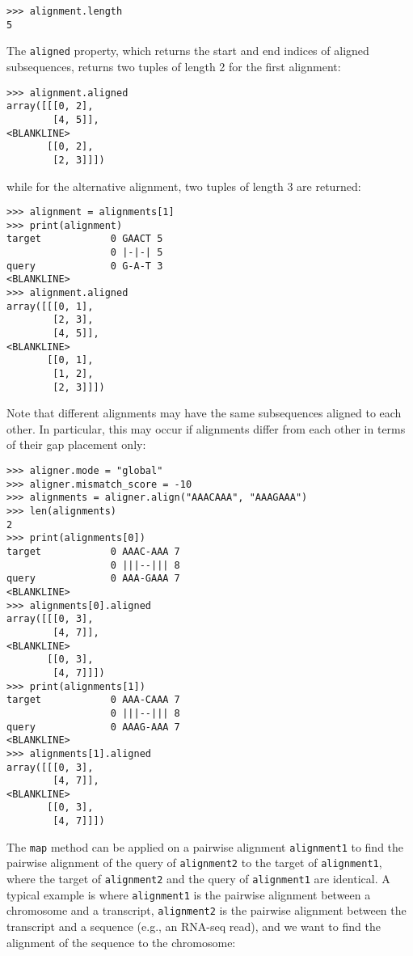 \begin{verbatim}
>>> alignment.length
5
\end{verbatim}

The \verb|aligned| property, which returns the start and end indices of aligned subsequences, returns two tuples of length 2 for the first alignment:

\begin{verbatim}
>>> alignment.aligned
array([[[0, 2],
        [4, 5]],
<BLANKLINE>
       [[0, 2],
        [2, 3]]])
\end{verbatim}
while for the alternative alignment, two tuples of length 3 are returned:
\begin{verbatim}
>>> alignment = alignments[1]
>>> print(alignment)
target            0 GAACT 5
                  0 |-|-| 5
query             0 G-A-T 3
<BLANKLINE>
>>> alignment.aligned
array([[[0, 1],
        [2, 3],
        [4, 5]],
<BLANKLINE>
       [[0, 1],
        [1, 2],
        [2, 3]]])
\end{verbatim}
Note that different alignments may have the same subsequences aligned to each other. In particular, this may occur if alignments differ from each other in terms of their gap placement only:

\begin{verbatim}
>>> aligner.mode = "global"
>>> aligner.mismatch_score = -10
>>> alignments = aligner.align("AAACAAA", "AAAGAAA")
>>> len(alignments)
2
>>> print(alignments[0])
target            0 AAAC-AAA 7
                  0 |||--||| 8
query             0 AAA-GAAA 7
<BLANKLINE>
>>> alignments[0].aligned
array([[[0, 3],
        [4, 7]],
<BLANKLINE>
       [[0, 3],
        [4, 7]]])
>>> print(alignments[1])
target            0 AAA-CAAA 7
                  0 |||--||| 8
query             0 AAAG-AAA 7
<BLANKLINE>
>>> alignments[1].aligned
array([[[0, 3],
        [4, 7]],
<BLANKLINE>
       [[0, 3],
        [4, 7]]])
\end{verbatim}

The \verb+map+ method can be applied on a pairwise alignment \verb+alignment1+ to find the pairwise alignment of the query of \verb+alignment2+ to the target of \verb+alignment1+, where the target of \verb+alignment2+ and the query of \verb+alignment1+ are identical. A typical example is where \verb+alignment1+ is the pairwise alignment between a chromosome and a transcript, \verb+alignment2+ is the pairwise alignment between the transcript and a sequence (e.g., an RNA-seq read), and we want to find the alignment of the sequence to the chromosome:

